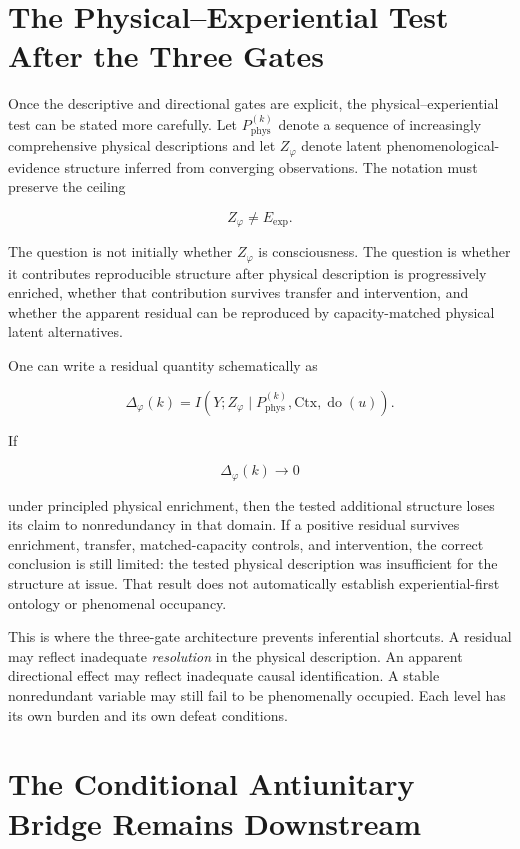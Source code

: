 \section{The Physical--Experiential Test After the Three Gates}

Once the descriptive and directional gates are explicit, the physical--experiential test can be stated more carefully. Let \(P_{\mathrm{phys}}^{(k)}\) denote a sequence of increasingly comprehensive physical descriptions and let \(Z_\varphi\) denote latent phenomenological-evidence structure inferred from converging observations. The notation must preserve the ceiling

\[
Z_\varphi\neq E_{\mathrm{exp}}.
\]

The question is not initially whether \(Z_\varphi\) is consciousness. The question is whether it contributes reproducible structure after physical description is progressively enriched, whether that contribution survives transfer and intervention, and whether the apparent residual can be reproduced by capacity-matched physical latent alternatives.

One can write a residual quantity schematically as

\[
\Delta_\varphi(k)
=
I\!\left(Y;Z_\varphi\mid P_{\mathrm{phys}}^{(k)},\mathrm{Ctx},\operatorname{do}(u)\right).
\]

If

\[
\Delta_\varphi(k)\longrightarrow0
\]

under principled physical enrichment, then the tested additional structure loses its claim to nonredundancy in that domain. If a positive residual survives enrichment, transfer, matched-capacity controls, and intervention, the correct conclusion is still limited: the tested physical description was insufficient for the structure at issue. That result does not automatically establish experiential-first ontology or phenomenal occupancy.

This is where the three-gate architecture prevents inferential shortcuts. A residual may reflect inadequate \emph{resolution} in the physical description. An apparent directional effect may reflect inadequate causal identification. A stable nonredundant variable may still fail to be phenomenally occupied. Each level has its own burden and its own defeat conditions.

\section{The Conditional Antiunitary Bridge Remains Downstream}

